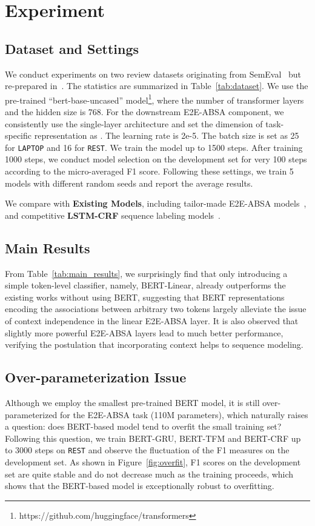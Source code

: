 \documentclass[11pt,a4paper]{article}
\begin{document}
\section{Experiment}
\subsection{Dataset and Settings}
We conduct experiments on two review datasets originating from SemEval~\cite{pontiki-etal-2014-semeval,pontiki-etal-2015-semeval,pontiki-etal-2016-semeval} but re-prepared in~\citet{li2019unified}. The statistics are summarized in Table~\ref{tab:dataset}. 
We use the pre-trained ``bert-base-uncased'' model\footnote{https://github.com/huggingface/transformers}, where the number of transformer layers  and the hidden size  is 768. For the downstream E2E-ABSA component, we consistently use the single-layer architecture and set the dimension of task-specific representation as . The learning rate is 2e-5. The batch size is set as 25 for \texttt{LAPTOP} and 16 for \texttt{REST}. We train the model up to 1500 steps. After training 1000 steps, we conduct model selection on the development set for very 100 steps according to the micro-averaged F1 score. Following these settings, we train 5 models with different random seeds and report the average results.



We compare with \textbf{Existing Models}, including tailor-made E2E-ABSA models~\cite{li2019unified,luo-etal-2019-doer,he-etal-2019-interactive}, and competitive \textbf{LSTM-CRF} sequence labeling models~\cite{lample-etal-2016-neural,ma-hovy-2016-end,liu2018empower}.

\subsection{Main Results}
From Table~\ref{tab:main_results}, we surprisingly find that only introducing a simple token-level classifier, namely, BERT-Linear, already outperforms the existing works without using BERT, suggesting that BERT representations encoding the associations between arbitrary two tokens largely alleviate the issue of context independence in the linear E2E-ABSA layer. It is also observed that slightly more powerful E2E-ABSA layers lead to much better performance, verifying the postulation that incorporating context helps to sequence modeling.

\subsection{Over-parameterization Issue}
Although we employ the smallest pre-trained BERT model, it is still over-parameterized for the E2E-ABSA task (110M parameters), which naturally raises a question: does BERT-based model tend to overfit the small training set? Following this question, we train BERT-GRU, BERT-TFM and BERT-CRF up to 3000 steps on \texttt{REST} and observe the fluctuation of the F1 measures on the development set. As shown in Figure~\ref{fig:overfit}, F1 scores on the development set are quite stable and do not decrease much as the training proceeds, which shows that the BERT-based model is exceptionally robust to overfitting. 
\end{document}

